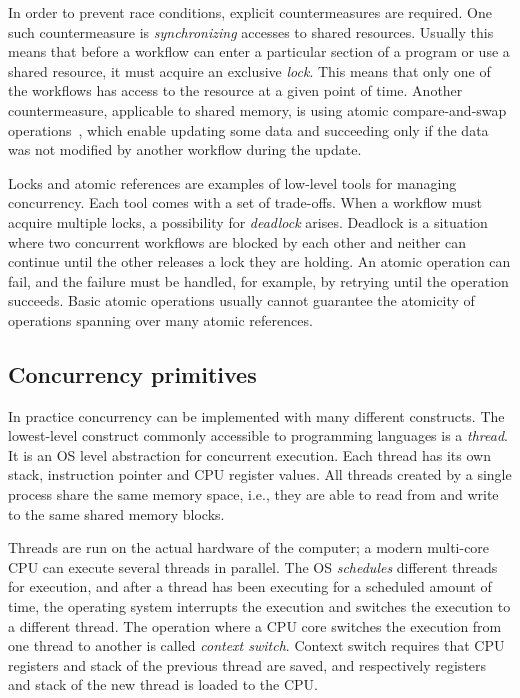 In order to prevent race conditions, explicit countermeasures are required. One such countermeasure is \emph{synchronizing} accesses to shared resources. Usually this means that before a workflow can enter a particular section of a program or use a shared resource, it must acquire an exclusive \emph{lock}. This means that only one of the workflows has access to the resource at a given point of time. Another countermeasure, applicable to shared memory, is using atomic compare-and-swap operations~\cite{concurrent-queue-algorithms}, which enable updating some data and  succeeding only if the data was not modified by another workflow during the update.

Locks and atomic references are examples of low-level tools for managing concurrency. Each tool comes with a set of trade-offs. When a workflow must acquire multiple locks, a possibility for \emph{deadlock} arises. Deadlock is a situation where two concurrent workflows are blocked by each other and neither can continue until the other releases a lock they are holding. An atomic operation can fail, and the failure must be handled, for example, by retrying until the operation succeeds. Basic atomic operations usually cannot guarantee the atomicity of operations spanning over many atomic references.


\subsection{Concurrency primitives}
In practice concurrency can be implemented with many different constructs. The lowest-level construct commonly accessible to programming languages is a \textit{thread}. It is an OS level abstraction for concurrent execution. Each thread has its own stack, instruction pointer and CPU register values. All threads created by a single process share the same memory space, i.e., they are able to read from and write to the same shared memory blocks.

Threads are run on the actual hardware of the computer; a modern multi-core CPU can execute several threads in parallel. The OS \textit{schedules} different threads for execution, and after a thread has been executing for a scheduled amount of time, the operating system interrupts the execution and switches the execution to a different thread. The operation where a CPU core switches the execution from one thread to another is called \textit{context switch}. Context switch requires that CPU registers and stack of the previous thread are saved, and respectively registers and stack of the new thread is loaded to the CPU.

